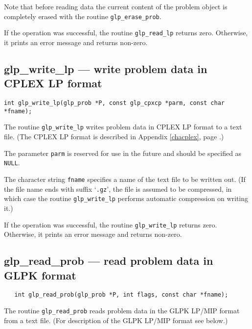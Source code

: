 Note that before reading data the current content of the problem object
is completely erased with the routine \verb|glp_erase_prob|.

\returns

If the operation was successful, the routine \verb|glp_read_lp| returns
zero. Otherwise, it prints an error message and returns non-zero.

\newpage

\subsection{glp\_write\_lp --- write problem data in CPLEX LP format}

\synopsis

{\tt int glp\_write\_lp(glp\_prob *P, const glp\_cpxcp *parm,
const char *fname);}

\description

The routine \verb|glp_write_lp| writes problem data in CPLEX LP format
to a text file. (The CPLEX LP format is described in Appendix
\ref{chacplex}, page \pageref{chacplex}.)

The parameter \verb|parm| is reserved for use in the future and should
be specified as \verb|NULL|.

The character string \verb|fname| specifies a name of the text file to
be written out. (If the file name ends with suffix `\verb|.gz|', the
file is assumed to be compressed, in which case the routine
\verb|glp_write_lp| performs automatic compression on writing it.)

\returns

If the operation was successful, the routine \verb|glp_write_lp|
returns zero. Otherwise, it prints an error message and returns
non-zero.

\subsection{glp\_read\_prob --- read problem data in GLPK format}

\synopsis

\begin{verbatim}
   int glp_read_prob(glp_prob *P, int flags, const char *fname);
\end{verbatim}

\description

The routine \verb|glp_read_prob| reads problem data in the GLPK LP/MIP
format from a text file. (For description of the GLPK LP/MIP format see
below.)

